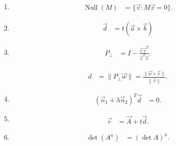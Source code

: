 \begin{enumerate}[label=\thesubsection.\arabic*, ref=\thesubsection.\theenumi, leftmargin=12mm, itemsep=4pt]

    \setcounter{enumi}{0}
    \item[\ref{question-short:C12-Q01}]
    \begin{align}
        \operatorname{Null}(M) &= \{\vec v:M\vec v=0\}.
        \label{formula:C12-Q01}
    \end{align}

    \setcounter{enumi}{1}
    \item[\ref{question-short:C12-Q05}]
    \begin{align}
        \vec d &= t(\vec a\times\vec b)
        \label{formula:C12-Q05}
    \end{align}

    \setcounter{enumi}{2}
    \item[\ref{question-short:C12-Q06}]
    \begin{align}
        P_\perp &= I-\frac{\vec v\vec v^T}{\vec v^T\vec v}.
        \label{formula:C12-Q06}
    \end{align}

    \begin{align}
        d &= \|P_\perp\vec w\|
        = \frac{\|\vec w\times\vec v\|}{\|\vec v\|}.
        \label{formula:C12-Q06-S01}
    \end{align}

    \setcounter{enumi}{3}
    \item[\ref{question-short:C12-Q10}]
    \begin{align}
        (\vec n_1+\lambda\vec n_2)^T\vec d &= 0.
        \label{formula:C12-Q10}
    \end{align}

    \setcounter{enumi}{4}
    \item[\ref{question-short:C12-Q15}]
    \begin{align}
        \vec r &= \vec A+t\vec d.
        \label{formula:C12-Q15}
    \end{align}


    \setcounter{enumi}{5}
    \item[\ref{question-short:C12-Q28}]
    \begin{align}
        \det(A^n) &= (\det A)^n.
        \label{formula:C12-Q28}
    \end{align}


\end{enumerate}
